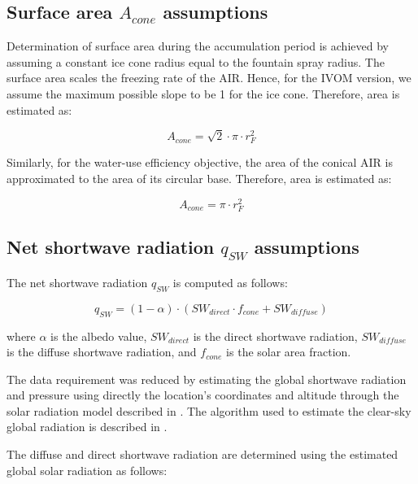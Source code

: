 \documentclass[tc, manuscript]{copernicus}
\begin{document}
\subsection{Surface area $A_{cone}$ assumptions}

Determination of surface area during the accumulation period is achieved by assuming a constant ice cone
radius equal to the fountain spray radius. The surface area scales the freezing rate of the AIR. Hence, for the
IVOM version, we assume the maximum possible slope to be 1 for the ice cone.
Therefore, area is estimated as:  

\begin{equation} A_{cone} =\sqrt{2} \cdot \pi \cdot r_{F}^2  \end{equation}

Similarly, for the water-use efficiency objective, the area of the conical AIR is approximated to the area of
its circular base. Therefore, area is estimated as:

\begin{equation} A_{cone} =\pi \cdot r_{F}^2  \end{equation}

\subsection{Net shortwave radiation \texorpdfstring{$q_{SW}$}{Lg} assumptions}
\label{sec:SW}

The net shortwave radiation $q_{SW}$ is computed as follows:

\begin{equation} 
q_{SW} = (1- \alpha) \cdot ( SW_{direct} \cdot f_{cone} + SW_{diffuse})
\label{eqn:SW} 
\end{equation}

where $\alpha$ is the albedo value, $SW_{direct}$ is the direct shortwave radiation, $SW_{diffuse}$ is the
diffuse shortwave radiation, and $f_{cone}$ is the solar area fraction.

The data requirement was reduced by estimating the global shortwave radiation and pressure using directly the
location's coordinates and altitude through the solar radiation model described in
\citet{holmgrenPvlibPythonPython2018}. The algorithm used to estimate the clear-sky global radiation is
described in \citet{ineichenBroadbandSimplifiedVersion2008}.  

The diffuse and direct shortwave radiation are determined using the estimated global solar radiation as follows:
\end{document}
